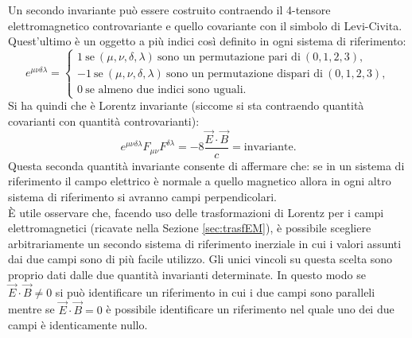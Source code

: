 Un secondo invariante può essere costruito contraendo il 4-tensore elettromagnetico controvariante e quello covariante con il simbolo di Levi-Civita. Quest'ultimo è un oggetto a più indici così definito in ogni sistema di riferimento:
\begin{equation}
    e^{\mu\nu\delta\lambda}=\begin{cases}
        1\ \text{se}\ (\mu,\nu,\delta,\lambda)\ \text{sono un permutazione pari di}\ (0,1,2,3),\\
        -1\ \text{se}\ (\mu,\nu,\delta,\lambda)\ \text{sono un permutazione dispari di}\ (0,1,2,3),\\
        0\ \text{se almeno due indici sono uguali.}
    \end{cases}\label{LeviCivita}
\end{equation}
Si ha quindi che è Lorentz invariante (siccome si sta contraendo quantità covarianti con quantità controvarianti):
\begin{equation}
    e^{\mu\nu\delta\lambda}F_{\mu\nu}F^{\delta\lambda}=-8\frac{\vec E\cdot\vec B}{c}=\text{invariante}.
\end{equation}
Questa seconda quantità invariante consente di affermare che: se in un sistema di riferimento il campo elettrico è normale a quello magnetico allora in ogni altro sistema di riferimento si avranno campi perpendicolari.\\ È utile osservare che, facendo uso delle trasformazioni di Lorentz per i campi elettromagnetici (ricavate nella Sezione \ref{sec:trasfEM}), è possibile scegliere arbitrariamente un secondo sistema di riferimento inerziale in cui i valori assunti dai due campi sono di più facile utilizzo. Gli unici vincoli su questa scelta sono proprio dati dalle due quantità invarianti determinate. In questo modo se $\vec E \cdot \vec B\neq0$ si può identificare un riferimento in cui i due campi sono paralleli mentre se $\vec E \cdot \vec B=0$ è possibile identificare un riferimento nel quale uno dei due campi è identicamente nullo.\\

